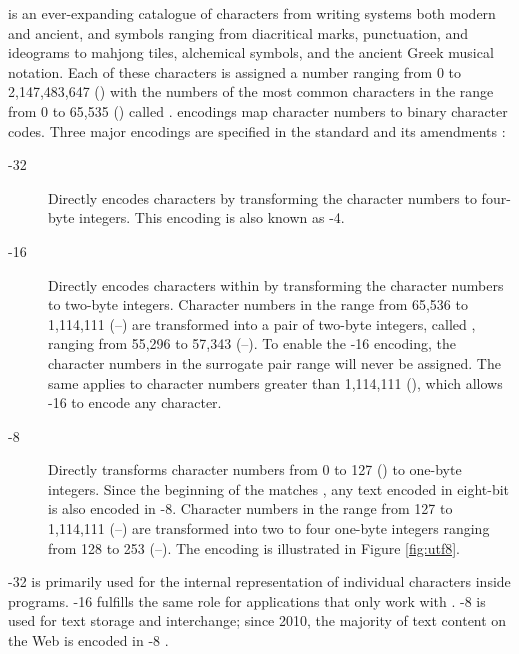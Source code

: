 \documentclass{book}
\begin{document}
 is an ever-expanding catalogue of characters from writing systems
both modern and ancient, and symbols ranging from diacritical marks,
punctuation, and ideograms to mahjong tiles, alchemical symbols, and the ancient
Greek musical notation. Each of these characters is assigned a number ranging
from 0 to 2,147,483,647 () with the numbers of the most common
characters in the range from 0 to 65,535 () called .
 encodings map character numbers to binary character codes. Three
major encodings are specified in the  standard and its
amendments \cite{iso93:am1,iso93:am2}:
\begin{description}
  \item[-32]
    Directly encodes  characters by transforming the character
    numbers to four-byte integers. This encoding is also known as
    -4.
  \item[-16]
    Directly encodes characters within  by transforming the
    character numbers to two-byte integers. Character numbers in the range from
    65,536 to 1,114,111 (\mbox{--}) are transformed
    into a pair of two-byte integers, called ,
    ranging from 55,296 to 57,343 (\mbox{--}). To enable
    the -16 encoding, the character numbers in the surrogate pair
    range will never be assigned. The same applies to character numbers greater
    than 1,114,111 (), which allows -16 to encode
    any  character.
  \item[-8]
    Directly transforms character numbers from 0 to 127 () to one-byte
    integers. Since the beginning of the  matches
    , any text encoded in eight-bit  is also
    encoded in -8. Character numbers in the range from 127 to
    1,114,111 (\mbox{--}) are transformed into two to
    four one-byte integers ranging from 128 to 253
    (\mbox{--}). The encoding is illustrated in Figure
    \ref{fig:utf8}.
\end{description}
-32 is primarily used for the internal representation of
individual  characters inside programs. -16 fulfills
the same role for applications that only work with .
-8 is used for text storage and interchange; since 2010, the
majority of text content on the Web is encoded in -8
\cite{qsuccess15}.
\end{document}
